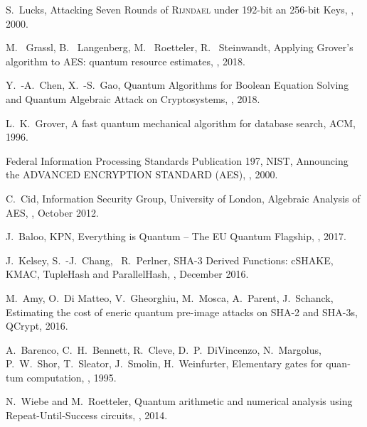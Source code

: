 \documentclass[a4paper,11pt]{article}
\begin{document}
\begin{otherlanguage}{english}
\begin{thebibliography}{1}
S.~Lucks,
\newblock Attacking Seven Rounds of \textsc{Rijndael} under 192-bit an 256-bit Keys,
, 2000.

M.~ Grassl, B.~ Langenberg, M.~ Roetteler, R.~ Steinwandt,
\newblock Applying Grover’s algorithm to AES: quantum resource estimates,
, 2018.

Y.~-A.~Chen, X.~-S.~Gao,
\newblock Quantum Algorithms for Boolean Equation Solving and Quantum Algebraic Attack on Cryptosystems,
, 2018.

L.~K.~Grover,
\newblock A fast quantum mechanical algorithm for database search, 
 ACM, 1996.

Federal Information Processing Standards Publication 197, NIST,
\newblock Announcing the ADVANCED ENCRYPTION STANDARD (AES),
, 2000.

C.~Cid, Information Security Group, University of London,
\newblock Algebraic Analysis of AES,
, October 2012.

J.~Baloo, KPN,
\newblock Everything is Quantum – The EU Quantum Flagship, 
, 2017.

J.~Kelsey, S.~-J.~Chang, ~R.~Perlner,
\newblock SHA-3 Derived Functions: cSHAKE, KMAC, TupleHash and ParallelHash, 
, December 2016.

M.~Amy, O.~Di Matteo, V.~Gheorghiu, M.~Mosca, A.~Parent, J.~Schanck,
\newblock Estimating the cost of eneric quantum pre-image attacks on SHA-2 and SHA-3s, 
 QCrypt, 2016.

A.~Barenco, C.~H.~Bennett, R.~Cleve, D.~P.~DiVincenzo, N.~Margolus, P.~W.~Shor, T.~Sleator, J.~Smolin, H.~Weinfurter,
\newblock Elementary gates for quantum computation, 
, 1995.

N.~Wiebe and M.~Roetteler,
\newblock Quantum arithmetic and numerical analysis using Repeat-Until-Success circuits, 
, 2014.
  
\end{thebibliography}



\end{otherlanguage}
\end{document}
